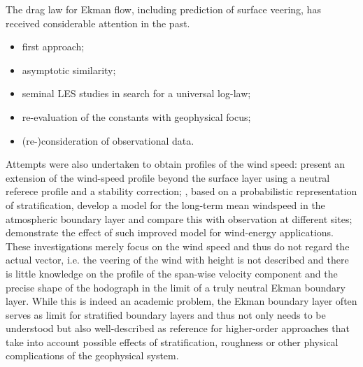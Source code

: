 \documentclass[a4paper,11pt]{article}
\begin{document}
The drag law for Ekman flow, including prediction of surface veering, has received considerable attention in the past.
\begin{itemize}
\item \cite{Rossby:1935wa} first approach;
\item \cite{Tennekes:1973jh, Blackadar:1968ew} asymptotic similarity;
\item \cite{Spalart:1989p2436, Spalart:2008p2432, Spalart:2009p2466} seminal LES studies in search for a universal log-law;
\item \cite{Ansorge:2014hf, Ansorge:2019di} re-evaluation of the constants with geophysical focus;
\item \cite{Hogstrom:1988wg, Hgstrm:1996kt} (re-)consideration of observational data.
\end{itemize} 
%
Attempts were also undertaken to obtain profiles of the wind speed: 
\cite{Gryning:2007dy} present an extension of the wind-speed profile beyond the surface layer using a neutral referece profile
and a stability correction;
\cite{Kelly:2010ev}, based on a probabilistic representation of stratification, develop a model for the long-term mean windspeed
in the atmospheric boundary layer and compare this with observation at different sites; 
\cite{Kelly:2016bs} demonstrate the effect of such improved model for wind-energy applications.
%
These investigations merely focus on the wind speed and thus do not regard the actual vector, i.e. the veering of
the wind with height is not described and there is little knowledge on the profile of the span-wise velocity component
and the precise shape of the hodograph in the limit of a truly neutral Ekman boundary layer.
%
While this is indeed an academic problem, the Ekman boundary layer often serves as limit for stratified boundary layers
and thus not only needs to be understood but also well-described as reference for higher-order approaches that take into
account possible effects of stratification, roughness or other physical complications of the geophysical system.
%
%
\end{document}
